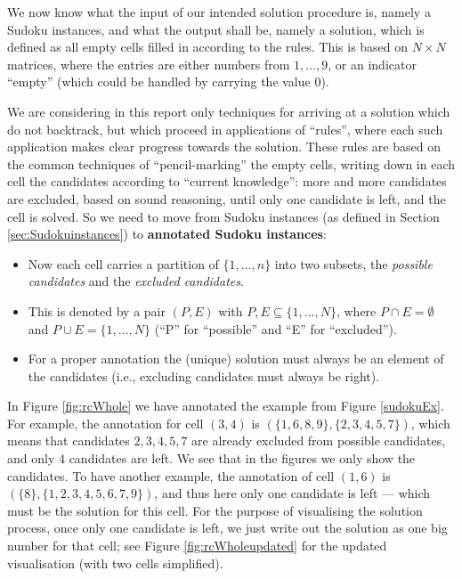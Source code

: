\documentclass[11pt]{report}
\newcommand{\set}[1]{\{ #1 \}}
\begin{document}
We now know what the input of our intended solution procedure is, namely a Sudoku instances, and what the output shall be, namely a solution, which is defined as all empty cells filled in according to the rules. This is based on $N \times N$ matrices, where the entries are either numbers from $1,\dots,9$, or an indicator ``empty'' (which could be handled by carrying the value $0$).

We are considering in this report only techniques for arriving at a solution which do not backtrack, but which proceed in applications of ``rules'', where each such application makes clear progress towards the solution. These rules are based on the common techniques of ``pencil-marking'' the empty cells, writing down in each cell the candidates according to ``current knowledge'': more and more candidates are excluded, based on sound reasoning, until only one candidate is left, and the cell is solved. So we need to move from Sudoku instances (as defined in Section \ref{sec:Sudokuinstances}) to \textbf{annotated Sudoku instances}:
\begin{itemize}
\item Now each cell carries a partition of $\set{1,\dots,n}$ into two subsets, the \emph{possible candidates} and the \emph{excluded candidates}.
\item This is denoted by a pair $(P,E)$ with $P, E \subseteq \set{1,\dots,N}$, where $P \cap E = \emptyset$ and $P \cup E = \set{1,\dots,N}$ (``P'' for ``possible'' and ``E'' for ``excluded'').
\item For a proper annotation the (unique) solution must always be an element of the candidates (i.e., excluding candidates must always be right).
\end{itemize}

In Figure \ref{fig:rcWhole} we have annotated the example from Figure \ref{sudokuEx}. For example, the annotation for cell $(3,4)$ is $(\set{1, 6, 8, 9}, \set{2, 3, 4, 5, 7})$, which means that candidates $2,3,4,5,7$ are already excluded from possible candidates, and only $4$ candidates are left. We see that in the figures we only show the candidates. To have another example, the annotation of cell $(1,6)$ is $(\set{8}, \set{1, 2, 3, 4, 5, 6, 7, 9})$, and thus here only one candidate is left --- which must be the solution for this cell. For the purpose of visualising the solution process, once only one candidate is left, we just write out the solution as one big number for that cell; see Figure \ref{fig:rcWholeupdated} for the updated visualisation (with two cells simplified).
\end{document}
